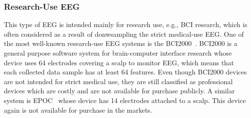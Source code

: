 \subsubsection{Research-Use EEG}
This type of EEG is intended mainly for research use, e.g., BCI research, which is often considered as a result of donwsampling the strict medical-use EEG. One of the most well-known research-use EEG systems is the BCI2000~\cite{schalk2004bci2000}. BCI2000 is a general purpose software system for brain-computer interface research whose device uses 64 electrodes covering a scalp to monitor EEG, which means that each collected data sample has at least 64 features. %
Even though BCI2000 devices are not intended for strict medical use, they are still classified as professional devices which are costly and are not available for purchase publicly. A similar system is EPOC~\cite{stytsenko2011evaluation} whose device has 14 electrodes attached to a scalp. This device again is not available for purchase in the markets. %

